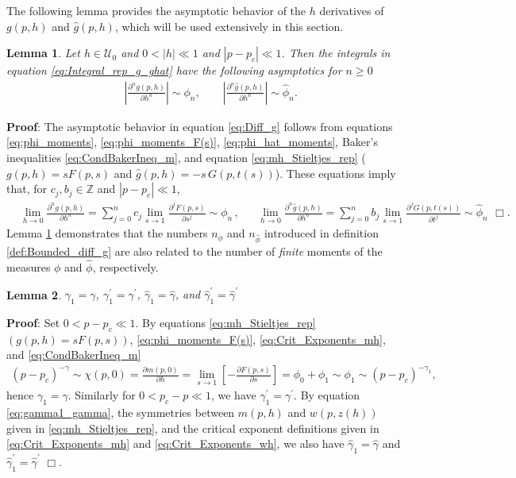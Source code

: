 \documentclass[english,12pt,jmp,graphicx]{revtex4-1}
\newtheorem{lemma}{Lemma}[section]
\newcommand{\ph}{\hat{\phi}}
\newcommand{\gh}{\hat{\gamma}}
\begin{document}
The following lemma provides the asymptotic behavior of the $h$
derivatives of $g(p,h)$ and $\hat{g}(p,h)$, which will be used
extensively in this section. 
\begin{lemma}\label{lem:h_diff_commutation}
  Let $h\in\mathcal{U}_0$ and $0<|h|\ll1$ and
   $|p-p_c|\ll1$. Then the integrals in equation
   \eqref{eq:Integral_rep_g_ghat} have the following asymptotics for
   $n\geq0$ 
\begin{align}\label{eq:Diff_g}
  &\left|\frac{\partial^ng(p,h)}{\partial h^n}\right|\sim\phi_n, \qquad
  \left|\frac{\partial^n\hat{g}(p,h)}{\partial h^n}\right|\sim\ph_n.
\end{align}
\end{lemma}
%
\noindent \textbf{Proof}:
%
The asymptotic behavior in equation
\eqref{eq:Diff_g} follows from equations
\eqref{eq:phi_moments}, \eqref{eq:phi_moments_F(s)},
\eqref{eq:phi_hat_moments}, Baker's inequalities
\eqref{eq:CondBakerIneq_m}, and equation \eqref{eq:mh_Stieltjes_rep}
 ($g(p,h)=sF(p,s)$ and $\hat{g}(p,h)=-s\,G(p,t(s))$).
These equations imply that, for $c_j,b_j\in\mathbb{Z}$ and  $|p-p_c|\ll1$,
%
\begin{align*}%
  &\lim_{h\to0}\frac{\partial^ng(p,h)}{\partial h^n}
         =\sum_{j=0}^nc_j\lim_{s\to1}\frac{\partial^jF(p,s)}{\partial s^j}\sim\phi_n\,,
  &&
  \lim_{h\to0}\frac{\partial^n\hat{g}(p,h)}{\partial h^n}
         =\sum_{j=0}^nb_j\lim_{s\to1}\frac{\partial^jG(p,t(s))}{\partial t^j}\sim\ph_n\, \ \Box.      
\end{align*}
Lemma \ref{lem:h_diff_commutation} demonstrates that
the numbers $n_\phi$ and $n_{\ph}$ introduced in definition
\ref{def:Bounded_diff_g} are also related to the number of
\emph{finite} moments of the measures $\phi$ and $\ph$, respectively. 
\begin{lemma}\label{lem:nonzero_gamma1_etc}
  $\gamma_1=\gamma$, $\gamma_1^\prime=\gamma^\prime$, $\gh_1=\gh$, and $\gh_1^\prime=\gh^\prime$
\end{lemma}
%
\noindent \textbf{Proof}:
%
Set $0<p-p_c\ll1$. By equations \eqref{eq:mh_Stieltjes_rep}
$(g(p,h)=sF(p,s))$, \eqref{eq:phi_moments_F(s)},
\eqref{eq:Crit_Exponents_mh}, and \eqref{eq:CondBakerIneq_m} 
%
\begin{align}\label{eq:gamma1_gamma}
  (p-p_c)^{-\gamma}\sim\chi(p,0)
          =\frac{\partial m(p,0)}{\partial h}
          =\lim_{s\to1}\left[-\frac{\partial F(p,s)}{\partial s}\right]
          =\phi_0+\phi_1
          \sim\phi_1\sim(p-p_c)^{-\gamma_1},
\end{align}
%
hence $\gamma_1=\gamma$. Similarly for $0<p_c-p\ll1$, we have $\gamma_1^\prime=\gamma^\prime$. By
equation \eqref{eq:gamma1_gamma}, the symmetries between $m(p,h)$ and
$w(p,z(h))$ given in \eqref{eq:mh_Stieltjes_rep}, and the critical exponent
definitions given in \eqref{eq:Crit_Exponents_mh} and
\eqref{eq:Crit_Exponents_wh}, we also have $\gh_1=\gh$ and
$\gh_1^\prime=\gh^\prime$ $\Box$.    
\end{document}

